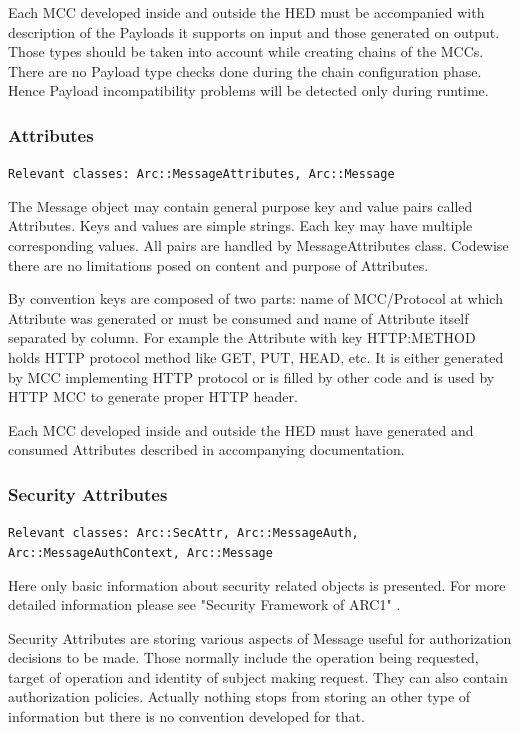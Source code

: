 \documentclass{book}
\begin{document}
Each MCC developed inside and outside the HED must be accompanied with description of the Payloads it supports on input and those generated on output. Those types should be taken into account while creating chains of the MCCs. There are no Payload type checks done during the chain configuration phase. Hence Payload incompatibility problems will be detected only during runtime.

\subsubsection{Attributes}

\texttt{Relevant classes: Arc::MessageAttributes, Arc::Message}

The Message object may contain general purpose key and value pairs called Attributes. Keys and values are simple strings. Each key may have multiple corresponding values. All pairs are handled by MessageAttributes class. Codewise there are no limitations posed on content and purpose of Attributes.

By convention keys are composed of two parts: name of MCC/Protocol at which Attribute was generated or must be consumed and name of Attribute itself separated by column. For example the Attribute with key HTTP:METHOD holds HTTP protocol method like GET, PUT, HEAD, etc. It is either generated by MCC implementing HTTP protocol or is filled by other code and is used by HTTP MCC to generate proper HTTP header.

Each MCC developed inside and outside the HED must have generated and consumed Attributes described in accompanying documentation.


\subsubsection{Security Attributes}

\texttt{Relevant classes: Arc::SecAttr, Arc::MessageAuth, Arc::MessageAuthContext, Arc::Message}

Here only basic information about security related objects is presented. For more detailed information please see "Security Framework of ARC1" \cite{sec-arc1}.

Security Attributes are storing various aspects of Message useful for authorization decisions to be made. Those normally include the operation being requested, target of operation and identity of subject making request. They can also contain authorization policies. Actually nothing stops from storing an other type of information but there is no convention developed for that.
\end{document}
